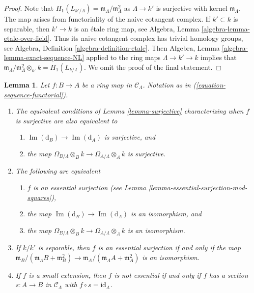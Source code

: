 \documentclass{stacks-project}
\theoremstyle{plain}
\newtheorem{lemma}[subsection]{Lemma}
\theoremstyle{definition}
\theoremstyle{remark}
\numberwithin{equation}{subsection}
\def\Im{\mathop{\mathrm{Im}}}
\begin{document}
\begin{proof}
Note that $H_1(L_{k'/\Lambda}) = \mathfrak m_\Lambda/\mathfrak m_\Lambda^2$
as $\Lambda \to k'$ is surjective with kernel $\mathfrak m_\Lambda$.
The map arises from functoriality of the naive cotangent complex.
If $k' \subset k$ is separable, then $k' \to k$ is an \'etale ring map, see
Algebra, Lemma \ref{algebra-lemma-etale-over-field}.
Thus its naive cotangent complex has trivial homology groups, see
Algebra, Definition \ref{algebra-definition-etale}.
Then
Algebra, Lemma \ref{algebra-lemma-exact-sequence-NL}
applied to the ring maps $\Lambda \to k' \to k$ implies that
$\mathfrak m_\Lambda/\mathfrak m_\Lambda^2 \otimes_{k'} k = H_1(L_{k/\Lambda})$.
We omit the proof of the final statement.
\end{proof}

\begin{lemma}
\label{lemma-essential-surjection}
Let $f: B \to A$ be a ring map in $\mathcal{C}_\Lambda$.
Notation as in (\ref{equation-sequence-functorial}).
\begin{enumerate}
\item The equivalent conditions of
Lemma \ref{lemma-surjective}
characterizing when $f$ is surjective are also equivalent to
\begin{enumerate}
\item $\Im(\text{d}_B) \to \Im(\text{d}_A)$ is surjective, and
\item the map $\Omega_{B/\Lambda} \otimes_B k \to
\Omega_{A/\Lambda} \otimes_A k$ is surjective.
\end{enumerate}
\item The following are equivalent
\begin{enumerate}
\item $f$ is an essential surjection
(see Lemma \ref{lemma-essential-surjection-mod-squares}),
\item the map $\Im(\text{d}_B) \to \Im(\text{d}_A)$ is an
isomorphism, and
\item the map $\Omega_{B/\Lambda} \otimes_B k \to
\Omega_{A/\Lambda} \otimes_A k$ is an isomorphism.
\end{enumerate}
\item If $k/k'$ is separable, then $f$ is an essential surjection if
and only if the map
$\mathfrak m_B/(\mathfrak m_\Lambda B + \mathfrak m_B^2) \to
\mathfrak m_A/(\mathfrak m_\Lambda A + \mathfrak m_A^2)$
is an isomorphism.
\item If $f$ is a small extension, then $f$ is not essential if and only if
$f$ has a section $s: A \to B$ in $\mathcal{C}_\Lambda$
with $f \circ s = \text{id}_A$.
\end{enumerate}
\end{lemma}
\end{document}
